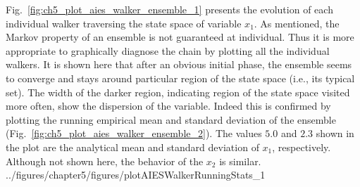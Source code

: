 Fig.~\ref{fig:ch5_plot_aies_walker_ensemble_1} presents the evolution of each individual walker traversing the state space of variable $x_1$.
As mentioned, the Markov property of an ensemble is not guaranteed at individual.
Thus it is more appropriate to graphically diagnose the chain by plotting all the individual walkers.
It is shown here that after an obvious initial phase,
the ensemble seems to converge and stays around particular region of the state space (i.e., its typical set).
The width of the darker region, indicating region of the state space visited more often,
show the dispersion of the variable. 
Indeed this is confirmed by plotting the running empirical mean and standard deviation of the ensemble (Fig.~\ref{fig:ch5_plot_aies_walker_ensemble_2}).
The values $5.0$ and $2.3$ shown in the plot are the analytical mean and standard deviation of $x_1$, respectively.
Although not shown here, the behavior of the  $x_2$ is similar.
{../figures/chapter5/figures/plotAIESWalkerRunningStats_1}


